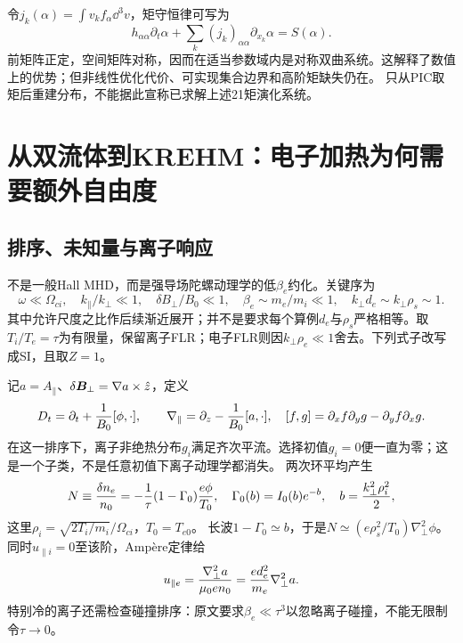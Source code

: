 令$j_k(\alpha)=\int v_kf_\alpha\dd^3v$，矩守恒律可写为
\begin{equation}
 h_{\alpha\alpha}\partial_t\alpha+
 \sum_k(j_k)_{\alpha\alpha}\partial_{x_k}\alpha=S(\alpha).
\end{equation}
前矩阵正定，空间矩阵对称，因而在适当参数域内是对称双曲系统。这解释了数值上的优势；但非线性优化代价、可实现集合边界和高阶矩缺失仍在。
\citet{E553}只从PIC取矩后重建分布，不能据此宣称已求解上述21矩演化系统。



\section{从双流体到KREHM：电子加热为何需要额外自由度}
\subsection{排序、未知量与离子响应}
\citet{E512}不是一般Hall MHD，而是强导场陀螺动理学的低$\beta_e$约化。关键序为
\begin{equation}
 \omega\ll\Omega_{ci},\quad k_\parallel/k_\perp\ll1,\quad
 \delta B_\perp/B_0\ll1,\quad \beta_e\sim m_e/m_i\ll1,
 \quad k_\perp d_e\sim k_\perp\rho_s\sim1.
\end{equation}
其中允许尺度之比作后续渐近展开；并不是要求每个算例$d_e$与$\rho_s$严格相等。取$T_i/T_e=\tau$为有限量，保留离子FLR；电子FLR则因$k_\perp\rho_e\ll1$舍去。下列式子改写成SI，且取$Z=1$。

记$a=A_\parallel$、$\delta\bm{B}_\perp=\nabla a\times\hat z$，定义
\begin{equation}
 D_t=\partial_t+{1\over B_0}[\phi,\cdot],\qquad
 \nabla_\parallel=\partial_z-{1\over B_0}[a,\cdot],\quad
 [f,g]=\partial_xf\partial_yg-\partial_yf\partial_xg.
\end{equation}
在这一排序下，离子非绝热分布$g_i$满足齐次平流。选择初值$g_i=0$便一直为零；这是一个子类，不是任意初值下离子动理学都消失。
两次环平均产生
\begin{equation}
 N\equiv{\delta n_e\over n_0}=-{1\over\tau}(1-\Gamma_0){e\phi\over T_0},\quad
 \Gamma_0(b)=I_0(b)e^{-b},\quad b={k_\perp^2\rho_i^2\over2},
 \label{eq:selected-quasi}
\end{equation}
这里$\rho_i=\sqrt{2T_i/m_i}/\Omega_{ci}$，$T_0=T_{e0}$。
长波$1-\Gamma_0\simeq b$，于是$N\simeq(e\rho_s^2/T_0)\nabla_\perp^2\phi$。
同时$u_{\parallel i}=0$至该阶，Ampère定律给
\begin{equation}
 u_{\parallel e}={\nabla_\perp^2a\over\mu_0en_0}
 ={e d_e^2\over m_e}\nabla_\perp^2a.
\end{equation}
特别冷的离子还需检查碰撞排序：原文要求$\beta_e\ll\tau^3$以忽略离子碰撞，不能无限制令$\tau\to0$。

